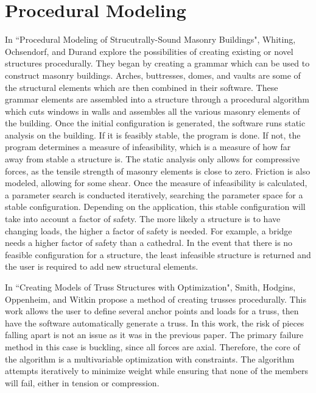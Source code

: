 \documentclass{thesis}
\begin{document}
\section{Procedural Modeling}
In ``Procedural Modeling of Strucutrally-Sound Masonry Buildings"\cite{whiting:2009}, Whiting, Ochsendorf, and Durand explore
the possibilities of creating existing or novel structures procedurally.  They began by creating a grammar
which can be used to construct masonry buildings.  Arches, buttresses, domes, and vaults are some of the
structural elements which are then combined in their software.  These grammar elements are assembled into
a structure through a procedural algorithm which cuts windows in walls and assembles
all the various masonry elements of the building.  Once the initial configuration is
generated, the software runs static analysis on the building.  If it is feasibly stable, the program is
done.  If not, the program determines a measure of infeasibility, which is a measure of how far away from
stable a structure is.  The static analysis only allows for compressive forces, as the tensile strength of
masonry elements is close to zero.  Friction is also modeled, allowing for some shear.  Once the measure
of infeasibility is calculated, a parameter search is conducted iteratively, searching the parameter space
for a stable configuration.  Depending on the application, this stable configuration will take into account
a factor of safety.  The more likely a structure is to have changing loads, the higher a factor of
safety is needed.  For example, a bridge needs a higher factor of safety than a cathedral.  In the event
that there is no feasible configuration for a structure, the least infeasible structure is returned and the
user is required to add new structural elements.

In ``Creating Models of Truss Structures with Optimization"\cite{Carnegie02creatingmodels}, Smith, Hodgins, Oppenheim, and Witkin propose
a method of creating trusses procedurally.  This work allows the user to define several anchor points
and loads for a truss, then have the software automatically generate a truss.  In this work, the risk
of pieces falling apart is not an issue as it was in the previous paper.  The primary failure method
in this case is buckling, since all forces are axial.  Therefore, the core of the algorithm is a
multivariable optimization with constraints.  The algorithm attempts iteratively to minimize weight
while ensuring that none of the members will fail, either in tension or compression.
\end{document}
